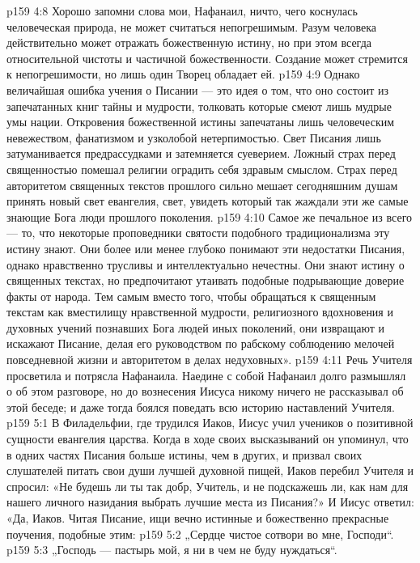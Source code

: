 \vs p159 4:8 Хорошо запомни слова мои, Нафанаил, ничто, чего коснулась человеческая природа, не может считаться непогрешимым. Разум человека действительно может отражать божественную истину, но при этом всегда относительной чистоты и частичной божественности. Создание может стремится к непогрешимости, но лишь один Творец обладает ей.
\vs p159 4:9 Однако величайшая ошибка учения о Писании --- это идея о том, что оно состоит из запечатанных книг тайны и мудрости, толковать которые смеют лишь мудрые умы нации. Откровения божественной истины запечатаны лишь человеческим невежеством, фанатизмом и узколобой нетерпимостью. Свет Писания лишь затуманивается предрассудками и затемняется суеверием. Ложный страх перед священностью помешал религии оградить себя здравым смыслом. Страх перед авторитетом священных текстов прошлого сильно мешает сегодняшним душам принять новый свет евангелия, свет, увидеть который так жаждали эти же самые знающие Бога люди прошлого поколения.
\vs p159 4:10 Самое же печальное из всего --- то, что некоторые проповедники святости подобного традиционализма эту истину знают. Они более или менее глубоко понимают эти недостатки Писания, однако нравственно трусливы и интеллектуально нечестны. Они знают истину о священных текстах, но предпочитают утаивать подобные подрывающие доверие факты от народа. Тем самым вместо того, чтобы обращаться к священным текстам как вместилищу нравственной мудрости, религиозного вдохновения и духовных учений познавших Бога людей иных поколений, они извращают и искажают Писание, делая его руководством по рабскому соблюдению мелочей повседневной жизни и авторитетом в делах недуховных».
\vs p159 4:11 \pc Речь Учителя просветила и потрясла Нафанаила. Наедине с собой Нафанаил долго размышлял о об этом разговоре, но до вознесения Иисуса никому ничего не рассказывал об этой беседе; и даже тогда боялся поведать всю историю наставлений Учителя.
\vs p159 5:1 В Филадельфии, где трудился Иаков, Иисус учил учеников о позитивной сущности евангелия царства. Когда в ходе своих высказываний он упоминул, что в одних частях Писания больше истины, чем в других, и призвал своих слушателей питать свои души лучшей духовной пищей, Иаков перебил Учителя и спросил: «Не будешь ли ты так добр, Учитель, и не подскажешь ли, как нам для нашего личного назидания выбрать лучшие места из Писания?» И Иисус ответил: «Да, Иаков. Читая Писание, ищи вечно истинные и божественно прекрасные поучения, подобные этим:
\vs p159 5:2 „Сердце чистое сотвори во мне, Господи“.
\vs p159 5:3 \pc „Господь --- пастырь мой, я ни в чем не буду нуждаться“.

